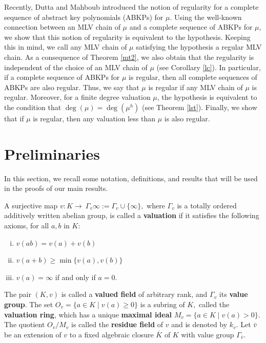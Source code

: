 \documentclass[11pt]{amsart}
\theoremstyle{definition}
\theoremstyle{remark}
\numberwithin{equation}{section}
\begin{document}
Recently, Dutta and Mahboub \cite{AM} introduced the notion of regularity for a complete sequence of abstract key polynomials (ABKPs) for $\mu$. Using the well-known connection between an MLV chain of $\mu$ and a complete sequence of ABKPs for $\mu$, we show that this notion of regularity is equivalent to the hypothesis. Keeping this in mind, we call any MLV chain of $\mu$ satisfying the hypothesis  a regular MLV chain. As a consequence of Theorem \ref{mt2}, we also obtain that the regularity is independent of the choice of an MLV chain of $\mu$ (see Corollary \ref{lc}). In particular, if a complete sequence of ABKPs for $\mu$ is regular, then all complete sequences of ABKPs are also regular. Thus, we say that $\mu$ is regular if any MLV chain of $\mu$ is regular. Moreover, for a finite degree valuation $\mu$, the hypothesis is equivalent to the condition that $\deg(\mu)=\deg(\mu^h)$ (see Theorem \ref{lst}). Finally, we show that if $\mu$ is regular, then any valuation less than $\mu$ is also regular. 
	 
	\section{Preliminaries}
		 In this section, we recall some notation, definitions, and results that will be used in the proofs of our main results.
		
 A surjective map $v:K \longrightarrow\ \Gamma_v\infty:=\Gamma_v\cup\{\infty\},$ where $\Gamma_v$ is a totally ordered additively written abelian group, is called a {\bf valuation} if it satisfies the following axioms, for all $a,b$ in $K$:
	\begin{enumerate}[(i)]
		
\item $v(ab)=v(a)+v(b)$
	\item $v(a+b)\geq \min\{v(a),v(b)\}$
			\item $v(a)=\infty$ if and only if $a=0$.
	\end{enumerate}
		The pair $(K,v)$ is called a {\bf valued field} of arbitrary rank, and  $\Gamma_ v$  its {\bf value group}. The set $O_v=\{a\in K \mid v(a)\geq 0\}$ is a subring of $K,$ called the {\bf valuation ring}, which has a unique {\bf maximal ideal} $M_v=\{a\in K\mid v(a)>0 \}.$ The quotient $O_v/M_v$ is called the {\bf residue field} of $v$ and is denoted by $k_v.$  Let $\bar{v}$ be an extension of $v$ to a fixed algebraic closure $\overline{K}$ of $K$ with value group $\Gamma_{\bar{v}}.$ 
		
\end{document}
